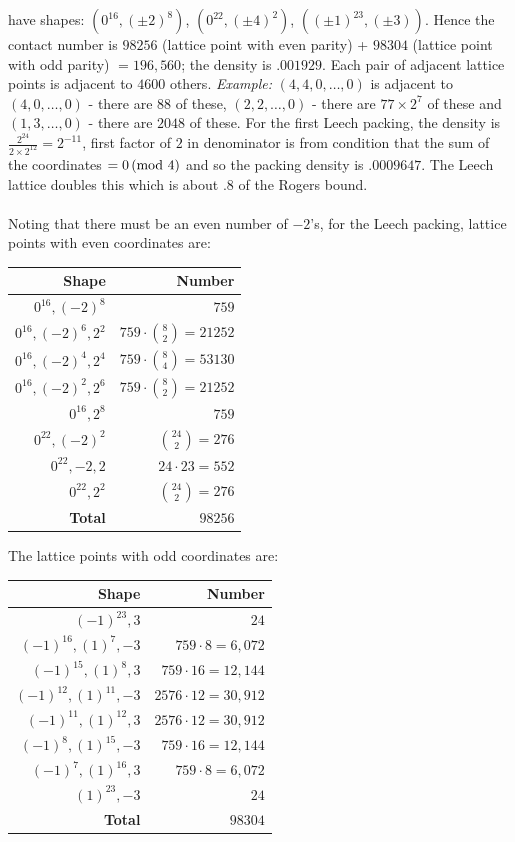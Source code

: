 have shapes: $(0^{16}, (\pm 2)^8)$, $(0^{22}, (\pm 4)^2)$, $((\pm 1)^{23}, (\pm 3))$.  
Hence the contact number is $98256$ (lattice point with even parity) + $98304$ 
(lattice point with odd parity) $= 196,560$;  
the density is $.001929$.  Each pair of adjacent lattice points is adjacent to $4600$
others. \emph{Example:} $(4,4, 0, \ldots, 0)$
is adjacent to $(4,0, \ldots , 0)$ - there are $88$ of these,
$(2,2, \ldots , 0)$ - there are $77 \times 2^7$ of these and
$(1,3, \ldots , 0)$ - there are $2048$ of these.
For the first Leech packing,
the density is ${\frac {2^{24}} { 2 \times 2^{12}}}= 2^{-11}$, 
first factor of $2$ in 
denominator is from condition that the sum of the
coordinates $= 0 \thinspace \textnormal{(mod } 4 \textnormal{)}$ and so the packing density is $.0009647$.  The
Leech lattice doubles this which is about $.8$ of the Rogers bound.
\\
\\
Noting that there must be an even number of $-2$'s,
for the Leech packing, lattice points with even coordinates are:
\begin{center}
\begin{tabular} {|r|r|}
\hline
{\bf Shape} & {\bf Number} \\
\hline
$0^{16}, (-2)^8$ & $759$ \\
$0^{16}, (-2)^6, 2^2$ & $759 \cdot {8 \choose 2}=21252$ \\
$0^{16}, (-2)^4, 2^4$ & $759 \cdot {8 \choose 4}=53130$ \\
$0^{16}, (-2)^2, 2^6$ & $759 \cdot {8 \choose 2}=21252$ \\
$0^{16}, 2^8$ & $759$ \\
$0^{22}, (-2)^2$ & ${24 \choose 2}=276$ \\
$0^{22}, -2, 2$ & $ 24 \cdot 23 =552$ \\
$0^{22}, 2^2$ & ${24 \choose 2}=276$ \\
\hline
{\bf Total} & $98256$\\
\hline
\end{tabular}
\end{center}
The lattice points with odd coordinates are:
\begin{center}
\begin{tabular} {|r|r|}
\hline
{\bf Shape} & {\bf Number} \\
\hline
$(-1)^{23}, 3$ & $24$ \\
$(-1)^{16}, (1)^{7}, -3$ & $759 \cdot 8= 6,072$ \\
$(-1)^{15}, (1)^{8}, 3$ & $759 \cdot 16= 12,144$ \\
$(-1)^{12}, (1)^{11}, -3$ & $2576 \cdot 12= 30,912$ \\
$(-1)^{11}, (1)^{12}, 3$ & $2576 \cdot 12= 30,912$ \\
$(-1)^{8}, (1)^{15}, -3$ & $759 \cdot 16= 12,144$ \\
$(-1)^{7}, (1)^{16}, 3$ & $759 \cdot 8= 6,072$ \\
$(1)^{23}, -3$ & $24$ \\
\hline
{\bf Total} & $98304$\\
\hline
\end{tabular}
\end{center}
